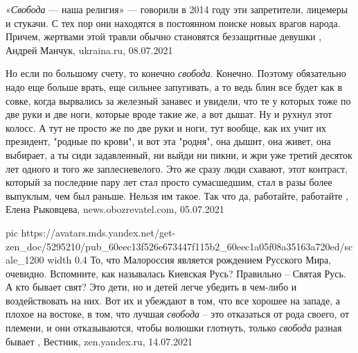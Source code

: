 «\emph{Свобода} — наша религия» — говорили в 2014 году эти запретители, лицемеры и
стукачи. С тех пор они находятся в постоянном поиске новых врагов народа.
Причем, жертвами этой травли обычно становятся беззащитные девушки
, 
Андрей Манчук, ukraina.ru, 08.07.2021

Но если по большому счету, то конечно \emph{свобода}. Конечно. Поэтому
обязательно надо еще больше врать, еще сильнее запугивать, а то ведь блин все
будет как в совке, когда вырвались за железный занавес и увидели, что те у
которых тоже по две руки и две ноги, которые вроде такие же, а вот дышат. Ну и
рухнул этот колосс. А тут не просто же по две руки и ноги, тут вообще, как их
учит их президент, "родные по крови", и вот эта "родня", она дышит, она живет,
она выбирает, а ты сиди задавленный, ни выйди ни пикни, и жри уже третий
десяток лет одного и того же заплесневелого. Это же сразу люди схавают, этот
контраст, который за последние пару лет стал просто сумасшедшим, стал в разы
более выпуклым, чем был раньше. Нельзя им такое. Так что да, работайте,
работайте
, 
Елена Рыковцева, news.obozrevatel.com, 05.07.2021

\ifcmt
  pic https://avatars.mds.yandex.net/get-zen_doc/5295210/pub_60eec13f526e673447f115b2_60eec1a05f08a35163a720ed/scale_1200
  width 0.4
\fi
То, что Малороссия является рождением Русского Мира, очевидно. Вспомните, как
называлась Киевская Русь? Правильно – Святая Русь. А кто бывает свят? Это дети,
но и детей легче убедить в чем-либо и воздействовать на них. Вот их и убеждают
в том, что все хорошее на западе, а плохое на востоке, в том, что лучшая
\emph{свобода} – это отказаться от рода своего, от племени, и они отказываются, чтобы
волюшки глотнуть, только \emph{свобода} разная бывает
, Вестник, zen.yandex.ru, 14.07.2021
